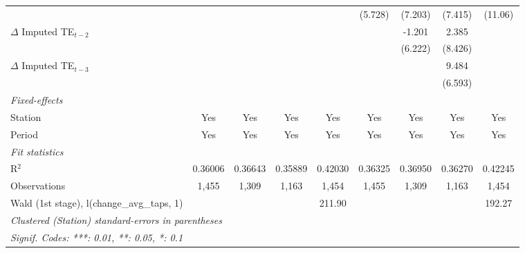 \begin{table}[htbp]
\begin{tabular}{lcccccccc}
                                                  &                &                &                &                & (5.728)        & (7.203)       & (7.415)      & (11.06)\\   
      $\Delta$ Imputed TE$_{t-2}$                 &                &                &                &                &                & -1.201        & 2.385        &   \\   
                                                  &                &                &                &                &                & (6.222)       & (8.426)      &   \\   
      $\Delta$ Imputed TE$_{t-3}$                 &                &                &                &                &                &               & 9.484        &   \\   
                                                  &                &                &                &                &                &               & (6.593)      &   \\   
      \midrule
      \emph{Fixed-effects}\\
      Station                                     & Yes            & Yes            & Yes            & Yes            & Yes            & Yes           & Yes          & Yes\\  
      Period                                      & Yes            & Yes            & Yes            & Yes            & Yes            & Yes           & Yes          & Yes\\  
      \midrule
      \emph{Fit statistics}\\
      R$^2$                                       & 0.36006        & 0.36643        & 0.35889        & 0.42030        & 0.36325        & 0.36950       & 0.36270      & 0.42245\\  
      Observations                                & 1,455          & 1,309          & 1,163          & 1,454          & 1,455          & 1,309         & 1,163        & 1,454\\  
      Wald (1st stage), l(change\_avg\_taps, 1)   &                &                &                & 211.90         &                &               &              & 192.27\\  
      \midrule \midrule
      \multicolumn{9}{l}{\emph{Clustered (Station) standard-errors in parentheses}}\\
      \multicolumn{9}{l}{\emph{Signif. Codes: ***: 0.01, **: 0.05, *: 0.1}}\\
   \end{tabular}
\end{table}


